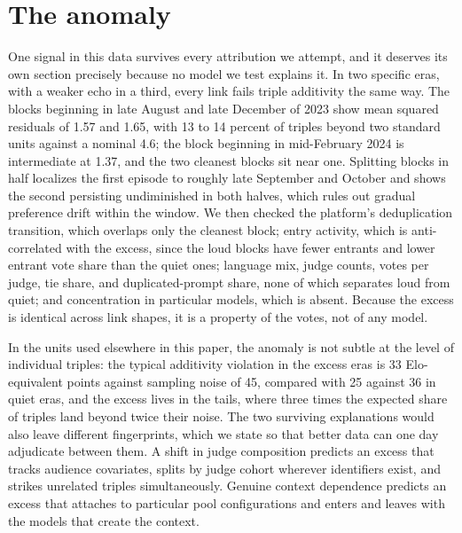 \documentclass[10pt]{article}
\begin{document}
\section{The anomaly}\label{sec:anomaly}

One signal in this data survives every attribution we attempt, and
it deserves its own section precisely because no model we test
explains it. In two specific eras, with a weaker echo in a third,
every link fails triple additivity the same way. The blocks
beginning in late August and late December of 2023 show mean squared
residuals of 1.57 and 1.65, with 13 to 14 percent of triples beyond
two standard units against a nominal 4.6; the block beginning in
mid-February 2024 is intermediate at 1.37, and the two cleanest
blocks sit near one. Splitting blocks in
half localizes the first episode to roughly late September and
October and shows the second persisting undiminished in both
halves, which rules out gradual preference drift within the window.
We then checked the platform's deduplication transition, which
overlaps only the cleanest block; entry activity, which is
anti-correlated with the excess, since the loud blocks have fewer
entrants and lower entrant vote share than the quiet ones; language
mix, judge counts, votes per judge, tie share, and duplicated-prompt
share, none of which separates loud from quiet; and concentration
in particular models, which is absent. Because the excess is
identical across link shapes, it is a property of the votes, not of
any model.

In the units used elsewhere in this paper, the anomaly is not subtle
at the level of individual triples: the typical additivity violation
in the excess eras is 33 Elo-equivalent points against sampling noise
of 45, compared with 25 against 36 in quiet eras, and the excess lives
in the tails, where three times the expected share of triples land
beyond twice their noise. The two surviving explanations would also
leave different fingerprints, which we state so that better data can
one day adjudicate between them. A shift in judge composition predicts
an excess that tracks audience covariates, splits by judge cohort
wherever identifiers exist, and strikes unrelated triples
simultaneously. Genuine context dependence predicts an excess that
attaches to particular pool configurations and enters and leaves with
the models that create the context.
\end{document}

